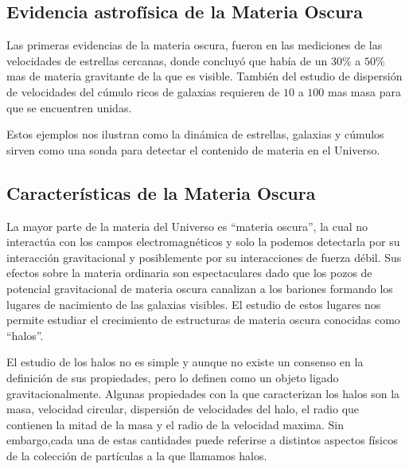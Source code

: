 \documentclass{beamer}
\begin{document}

\subsection{Evidencia astrofísica de la Materia Oscura}
	\begin{frame}
		Las primeras evidencias de la materia oscura, fueron en las mediciones de las velocidades de estrellas cercanas, donde concluyó que había de un $30\%$ a $50\%$ mas de materia gravitante de la que es visible. También del estudio de dispersión de velocidades del cúmulo ricos de galaxias requieren de $10$ a $100$ mas masa para que se encuentren unidas. 
		
		Estos ejemplos nos ilustran como la dinámica de estrellas, galaxias y cúmulos sirven como una sonda para detectar el contenido de materia en el Universo.


	\end{frame}
\subsection{Características de la Materia Oscura}

	\begin{frame}
			La mayor parte de la materia del Universo es ``materia oscura'', la cual no interactúa con los campos electromagnéticos y solo la podemos detectarla por su interacción gravitacional y posiblemente por su interacciones de fuerza débil. Sus efectos sobre la materia ordinaria son espectaculares dado que los pozos de potencial gravitacional de materia oscura canalizan a los bariones formando los lugares de nacimiento de las galaxias visibles. El estudio de estos lugares nos permite estudiar el crecimiento de estructuras de materia oscura conocidas como ``halos''.

	\end{frame}


	\begin{frame}
		El estudio de los halos no es simple y aunque no existe un consenso en la definición de sus propiedades, pero lo definen como un objeto ligado gravitacionalmente. Algunas propiedades con la que caracterizan los halos son la masa, velocidad circular, dispersión de velocidades del halo, el radio que contienen la mitad de la masa y el radio  de la velocidad maxima. Sin embargo,cada una de estas cantidades puede referirse a distintos aspectos físicos de la colección de partículas a la que llamamos halos.
	\end{frame}
\end{document}
